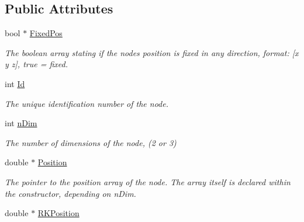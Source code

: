 \subsection*{Public Attributes}
\begin{DoxyCompactItemize}
\item 
\hypertarget{classNode_a80edc54e934bdfc08b66933d4c7fd6f4}{}bool $\ast$ \hyperlink{classNode_a80edc54e934bdfc08b66933d4c7fd6f4}{Fixed\+Pos}\label{classNode_a80edc54e934bdfc08b66933d4c7fd6f4}

\begin{DoxyCompactList}\small\item\em The boolean array stating if the node\textquotesingle{}s position is fixed in any direction, format\+: \mbox{[}x y z\mbox{]}, true = fixed. \end{DoxyCompactList}\item 
\hypertarget{classNode_a1bd379569cc1a8b96432e61971aed4d9}{}int \hyperlink{classNode_a1bd379569cc1a8b96432e61971aed4d9}{Id}\label{classNode_a1bd379569cc1a8b96432e61971aed4d9}

\begin{DoxyCompactList}\small\item\em The unique identification number of the node. \end{DoxyCompactList}\item 
\hypertarget{classNode_ae23958d63ecbf80559c307c955be8227}{}int \hyperlink{classNode_ae23958d63ecbf80559c307c955be8227}{n\+Dim}\label{classNode_ae23958d63ecbf80559c307c955be8227}

\begin{DoxyCompactList}\small\item\em The number of dimensions of the node, (2 or 3) \end{DoxyCompactList}\item 
\hypertarget{classNode_a8fdca7042dc0cc7e342eb3c87cbbfb56}{}double $\ast$ \hyperlink{classNode_a8fdca7042dc0cc7e342eb3c87cbbfb56}{Position}\label{classNode_a8fdca7042dc0cc7e342eb3c87cbbfb56}

\begin{DoxyCompactList}\small\item\em The pointer to the position array of the node. The array itself is declared within the constructor, depending on n\+Dim. \end{DoxyCompactList}\item 
\hypertarget{classNode_abfa97f5fa4e95c932b4e3e0daabb062a}{}double $\ast$ \hyperlink{classNode_abfa97f5fa4e95c932b4e3e0daabb062a}{R\+K\+Position}\label{classNode_abfa97f5fa4e95c932b4e3e0daabb062a}


\end{DoxyCompactItemize}
